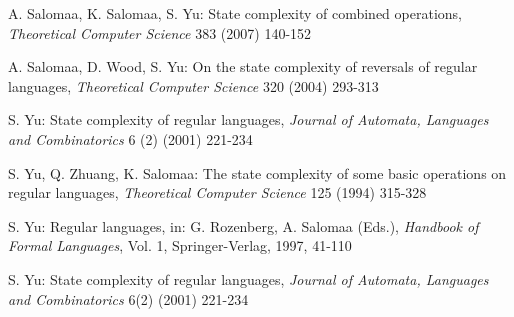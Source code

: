 \documentclass[10pt]{article}
\begin{document}
\begin{thebibliography}{9}
    A. Salomaa, K. Salomaa, S. Yu:
    State complexity of combined operations,
    {\it Theoretical Computer Science} 383 (2007) 140-152

    A. Salomaa, D. Wood, S. Yu:
    On the state complexity of reversals of regular languages,
    {\it Theoretical Computer Science} 320 (2004) 293-313

    S. Yu:
    State complexity of regular languages,
    {\it Journal of Automata, Languages and Combinatorics} 6 (2) (2001) 221-234

    S. Yu, Q. Zhuang, K. Salomaa:
    The state complexity of some basic operations on regular languages,
    {\it Theoretical Computer Science} 125 (1994) 315-328

    S. Yu:
    Regular languages,
    in: G. Rozenberg, A. Salomaa (Eds.), {\it Handbook of Formal Languages}, Vol. 1, Springer-Verlag, 1997, 41-110

    S. Yu:
    State complexity of regular languages,
    {\it Journal of Automata, Languages and Combinatorics} 6(2) (2001) 221-234
\end{thebibliography}
\end{document}
